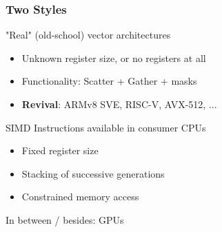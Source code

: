 \documentclass[xcolor={x11names,svgnames}]{beamer}
\begin{document}

\begin{frame}
  \frametitle{Two Styles}

\begin{exampleblock}{"Real" (old-school) vector architectures}
  \begin{itemize}
  \item Unknown register size, or no registers at all
  \item Functionality: Scatter + Gather + masks
  \item \textbf{\alert{Revival}}: ARMv8 SVE, RISC-V, AVX-512, ...
  \end{itemize}
\end{exampleblock}

\begin{alertblock}{SIMD Instructions available in consumer CPUs}
  \begin{itemize}
  \item Fixed register size
  \item Stacking of successive generations
  \item Constrained memory access
  \end{itemize}
\end{alertblock}

In between / besides: GPUs
\end{frame}

\end{document}
